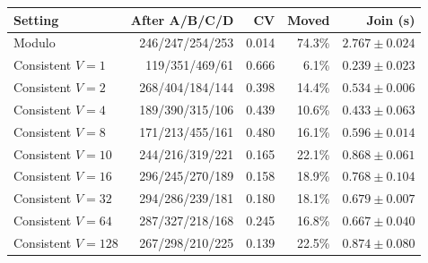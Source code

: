 \begin{center}
\label{tab:results}
\vspace{3pt}
{\fontsize{10.5}{12.5}\selectfont
\setlength{\tabcolsep}{5pt}
\begin{tabular}{@{}lr r r r@{}}
\toprule
Setting & After A/B/C/D & CV & Moved & Join (s) \\
\midrule
Modulo & 246/247/254/253 & 0.014 & 74.3\% & $2.767 \pm 0.024$ \\
Consistent $V=1$ & 119/351/469/61 & 0.666 & 6.1\% & $0.239 \pm 0.023$ \\
Consistent $V=2$ & 268/404/184/144 & 0.398 & 14.4\% & $0.534 \pm 0.006$ \\
Consistent $V=4$ & 189/390/315/106 & 0.439 & 10.6\% & $0.433 \pm 0.063$ \\
Consistent $V=8$ & 171/213/455/161 & 0.480 & 16.1\% & $0.596 \pm 0.014$ \\
Consistent $V=10$ & 244/216/319/221 & 0.165 & 22.1\% & $0.868 \pm 0.061$ \\
Consistent $V=16$ & 296/245/270/189 & 0.158 & 18.9\% & $0.768 \pm 0.104$ \\
Consistent $V=32$ & 294/286/239/181 & 0.180 & 18.1\% & $0.679 \pm 0.007$ \\
Consistent $V=64$ & 287/327/218/168 & 0.245 & 16.8\% & $0.667 \pm 0.040$ \\
Consistent $V=128$ & 267/298/210/225 & 0.139 & 22.5\% & $0.874 \pm 0.080$ \\
\bottomrule
\end{tabular}}
\end{center}
